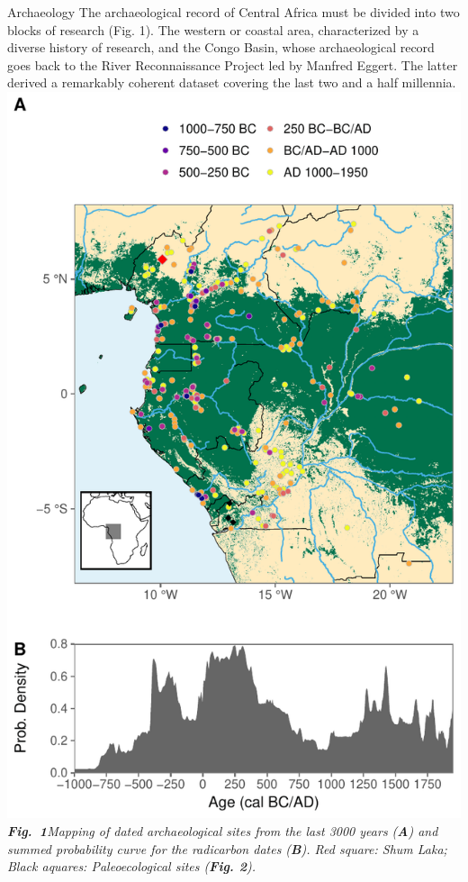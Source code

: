 \documentclass[a0]{sciposter}
\begin{document}
{\begin{minipage}[t][102cm][t]{82cm}
\begin{minipage}[t]{77cm}
\begin{multicols}{3}
{\fontsize{38}{42} \selectfont \textcolor{HeadCol}{Archaeology}}
\bigbreak
{\fontsize{28}{36} \selectfont The archaeological record of Central Africa must be divided into two blocks of research (Fig. 1). The western or coastal area, characterized by a diverse history of research, and the Congo Basin, whose archaeological record goes back to the River Reconnaissance Project led by Manfred Eggert. The latter derived a remarkably coherent dataset covering the last two and a half millennia.}
\bigbreak
\includegraphics[width = \linewidth]{img/FigArch.pdf}
{\fontsize{28}{36} \selectfont \textit{\textbf{Fig.~1}\hspace{1em}Mapping of dated archaeological sites from the last 3000 years (\textbf{A}) and summed probability curve for the radicarbon dates (\textbf{B}). Red square: Shum Laka; Black aquares: Paleoecological sites (\textbf{Fig. 2}).}}

\end{multicols}
\end{minipage}
\end{minipage}}
\end{document}
